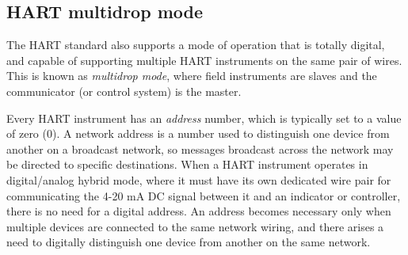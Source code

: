 





\filbreak
\subsection{HART multidrop mode}

The HART standard also supports a mode of operation that is totally digital, and capable of supporting multiple HART instruments on the same pair of wires.  This is known as \textit{multidrop mode}, where field instruments are slaves and the communicator (or control system) is the master.   

Every HART instrument has an \textit{address} number, which is typically set to a value of zero (0).  A network address is a number used to distinguish one device from another on a broadcast network, so messages broadcast across the network may be directed to specific destinations.  When a HART instrument operates in digital/analog hybrid mode, where it must have its own dedicated wire pair for communicating the 4-20 mA DC signal between it and an indicator or controller, there is no need for a digital address.  An address becomes necessary only when multiple devices are connected to the same network wiring, and there arises a need to digitally distinguish one device from another on the same network.  

